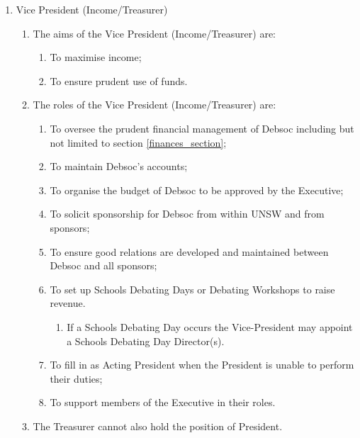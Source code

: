 \begin{enumerate}
\item Vice President (Income/Treasurer)
  \begin{enumerate}
  \item The aims of the Vice President (Income/Treasurer) are:
    \begin{enumerate}
    \item To maximise income;
    \item To ensure prudent use of funds.
    \end{enumerate}
  \item The roles of the Vice President (Income/Treasurer) are:
    \begin{enumerate}
    \item To oversee the prudent financial management of Debsoc including but not limited to section \ref{finances_section};
    \item To maintain Debsoc’s accounts;
    \item To organise the budget of Debsoc to be approved by the Executive;
    \item To solicit sponsorship for Debsoc from within UNSW and from sponsors;
    \item To ensure good relations are developed and maintained between Debsoc and all sponsors;
    \item To set up Schools Debating Days or Debating Workshops to raise revenue.
      \begin{enumerate}
      \item If a Schools Debating Day occurs the Vice-President may appoint a Schools Debating Day Director(s).
      \end{enumerate}
    \item To fill in as Acting President when the President is unable to perform their duties;
    \item To support members of the Executive in their roles.
    \end{enumerate}
  \item The Treasurer cannot also hold the position of President.
  \end{enumerate}


\end{enumerate}

